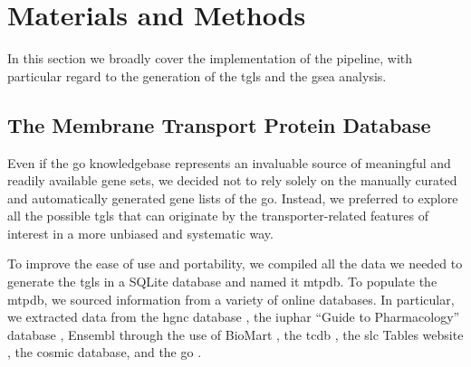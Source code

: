 \section{Materials and Methods}

In this section we broadly cover the implementation of the pipeline, with particular regard to the generation of the \glspl{tgl} and the \gls{gsea} analysis.

\subsection{The Membrane Transport Protein Database}

Even if the \gls{go} knowledgebase \cite{ashburnerGeneOntologyTool2000,thegeneontologyconsortiumGeneOntologyKnowledgebase2023} represents an invaluable source of meaningful and readily available gene sets, we decided not to rely solely on the manually curated and automatically generated gene lists of the \gls{go}.
Instead, we preferred to explore all the possible \glspl{tgl} that can originate by the transporter-related features of interest in a more unbiased and systematic way.

To improve the ease of use and portability, we compiled all the data we needed to generate the \glspl{tgl} in a SQLite database and named it \gls{mtpdb}.
To populate the \gls{mtpdb}, we sourced information from a variety of online databases.
In particular, we extracted data from %
the \gls{hgnc} database \cite{sealGenenamesOrgHGNC2023},
the \gls{iuphar} ``Guide to Pharmacology'' database \cite{hardingIUPHARBPSGuide2022},
Ensembl \cite{cunninghamEnsembl20222022} through the use of BioMart \cite{smedleyBioMartBiologicalQueries2009},
the \gls{tcdb} \cite{saierTransporterClassificationDatabase2021},
the \gls{slc} Tables website \cite{hedigerABCsMembraneTransporters2013},
the \gls{cosmic} \cite{tateCOSMICCatalogueSomatic2019} database,
and the \gls{go} \cite{ashburnerGeneOntologyTool2000, thegeneontologyconsortiumGeneOntologyKnowledgebase2023}.

